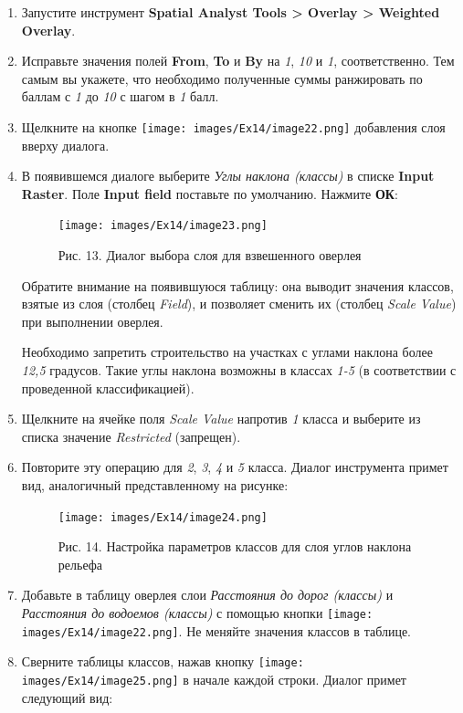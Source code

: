 \documentclass[12pt,]{book}
\begin{document}
\begin{enumerate}
\def\labelenumi{\arabic{enumi}.}
\item
  Запустите инструмент \textbf{Spatial Analyst Tools \textgreater{} Overlay \textgreater{} Weighted Overlay}.
\item
  Исправьте значения полей \textbf{From}, \textbf{To} и \textbf{By} на \emph{1}, \emph{10} и \emph{1}, соответственно. Тем самым вы укажете, что необходимо полученные суммы ранжировать по баллам с \emph{1} до \emph{10} с шагом в \emph{1} балл.
\item
  Щелкните на кнопке \texttt{[image: images/Ex14/image22.png]} добавления слоя вверху диалога.
\item
  В появившемся диалоге выберите \emph{Углы наклона (классы)} в списке \textbf{Input Raster}. Поле \textbf{Input field} поставьте по умолчанию. Нажмите \textbf{ОК}:

  \begin{figure}
  \centering
  \texttt{[image: images/Ex14/image23.png]}
  \caption{Рис. 13. Диалог выбора слоя для взвешенного оверлея}
  \end{figure}

  Обратите внимание на появившуюся таблицу: она выводит значения классов, взятые из слоя (столбец \emph{Field}), и позволяет сменить их (столбец \emph{Scale Value}) при выполнении оверлея.

  Необходимо запретить строительство на участках с углами наклона более \emph{12,5} градусов. Такие углы наклона возможны в классах \emph{1-5} (в соответствии с проведенной классификацией).
\item
  Щелкните на ячейке поля \emph{Scale Value} напротив \emph{1} класса и выберите из списка значение \emph{Restricted} (запрещен).
\item
  Повторите эту операцию для \emph{2}, \emph{3}, \emph{4} и \emph{5} класса. Диалог инструмента примет вид, аналогичный представленному на рисунке:

  \begin{figure}
  \centering
  \texttt{[image: images/Ex14/image24.png]}
  \caption{Рис. 14. Настройка параметров классов для слоя углов наклона рельефа}
  \end{figure}
\item
  Добавьте в таблицу оверлея слои \emph{Расстояния до дорог (классы)} и \emph{Расстояния до водоемов (классы)} с помощью кнопки \texttt{[image: images/Ex14/image22.png]}. Не меняйте значения классов в таблице.
\item
  Сверните таблицы классов, нажав кнопку \texttt{[image: images/Ex14/image25.png]} в начале каждой строки. Диалог примет следующий вид:


\end{enumerate}
\end{document}
